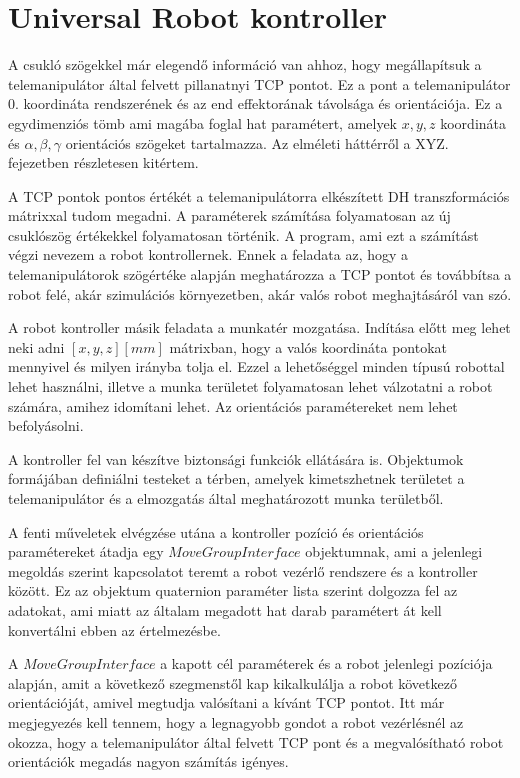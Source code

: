 \section{Universal Robot kontroller}

A csukló szögekkel már elegendő információ van ahhoz, hogy megállapítsuk a telemanipulátor által felvett pillanatnyi TCP pontot. Ez a pont a telemanipulátor 0. koordináta rendszerének és az end effektorának távolsága és orientációja. Ez a egydimenziós tömb ami magába foglal hat paramétert, amelyek $x,y,z$ koordináta és $\alpha,\beta,\gamma$ orientációs szögeket tartalmazza. Az elméleti háttérről a XYZ. fejezetben részletesen kitértem.

A TCP pontok pontos értékét a telemanipulátorra elkészített DH transzformációs mátrixxal tudom megadni. A paraméterek számítása folyamatosan az új csuklószög értékekkel folyamatosan történik. A program, ami ezt a számítást végzi nevezem a robot kontrollernek. Ennek a feladata az, hogy a telemanipulátorok szögértéke alapján meghatározza a TCP pontot és továbbítsa a robot felé, akár szimulációs környezetben, akár valós robot meghajtásáról van szó.

A robot kontroller másik feladata a munkatér mozgatása. Indítása előtt meg lehet neki adni $[x,y,z] [mm]$ mátrixban, hogy a valós koordináta pontokat mennyivel és milyen irányba tolja el. Ezzel a lehetőséggel minden típusú robottal lehet használni, illetve a munka területet folyamatosan lehet válzotatni a robot számára, amihez idomítani lehet. Az orientációs paramétereket nem lehet befolyásolni.

A kontroller fel van készítve biztonsági funkciók ellátására is. Objektumok formájában definiálni testeket a térben, amelyek kimetszhetnek területet a telemanipulátor és a elmozgatás által meghatározott munka területből.

A fenti műveletek elvégzése utána a kontroller pozíció és orientációs paramétereket átadja egy $MoveGroupInterface$ objektumnak, ami a jelenlegi megoldás szerint kapcsolatot teremt a robot vezérlő rendszere és a kontroller között. Ez az objektum quaternion paraméter lista szerint dolgozza fel az adatokat, ami miatt az általam megadott hat darab paramétert át kell konvertálni ebben az értelmezésbe.

A $MoveGroupInterface$ a kapott cél paraméterek és a robot jelenlegi pozíciója alapján, amit a következő szegmenstől kap kikalkulálja a robot következő orientációját, amivel megtudja valósítani a kívánt TCP pontot. Itt már megjegyezés kell tennem, hogy a legnagyobb gondot a robot vezérlésnél az okozza, hogy a telemanipulátor által felvett TCP pont és a megvalósítható robot orientációk megadás nagyon számítás igényes.

